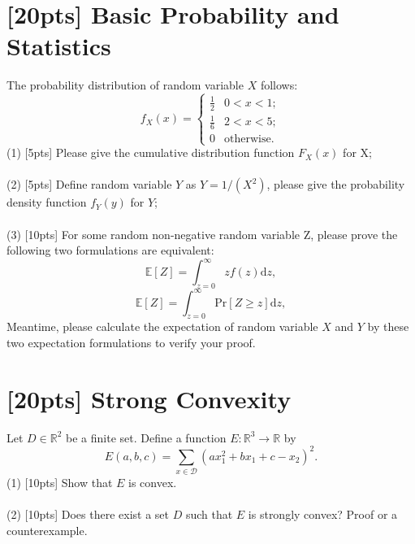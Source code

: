 \documentclass{article}
\begin{document}
	\section{[20pts] Basic Probability and Statistics}
	The probability distribution of random variable $X$ follows:\\
	\begin{equation}
	f_X(x)=\begin{cases}
	\frac{1}{2} & 0<x<1;\\
	\frac{1}{6} & 2<x<5;\\
	0 & \text{otherwise}.
	\end{cases}
	\end{equation} 
	(1) [5pts] Please give the cumulative distribution function $F_X(x)$ for X;\\ \\ 
	(2) [5pts] Define random variable $Y$ as $Y=1/(X^2)$, please give the probability density function $f_Y(y)$ for $Y$;\\ \\
	(3) [10pts] For some random non-negative random variable Z, please prove the following two formulations are equivalent:\\
	\begin{equation}
	\mathbb{E}[Z]=\int^\infty_{z=0} z f(z)\mathrm{d}z,
	\end{equation}
	\begin{equation}
	\mathbb{E}[Z]=\int^\infty_{z=0} \mathrm{Pr}[Z\geq z]\mathrm{d}z,
	\end{equation}
	Meantime, please calculate the expectation of random variable $X$ and $Y$ by these two expectation formulations to verify your proof.
	\section{[20pts] Strong Convexity}
	Let $D\in \mathbb{R}^2$ be a finite set. Define a function $E: \mathbb{R}^3 \rightarrow \mathbb{R}$ by\\
	\begin{equation}
	E(a,b,c)=\sum\limits_{x\in\mathcal{D}}(ax^2_1+bx_1+c-x_2)^2.
	\end{equation}
	(1) [10pts] Show that $E$ is convex.\\ \\
	(2) [10pts] Does there exist a set $D$ such that $E$ is strongly convex? Proof or a counterexample.
	
\end{document}
